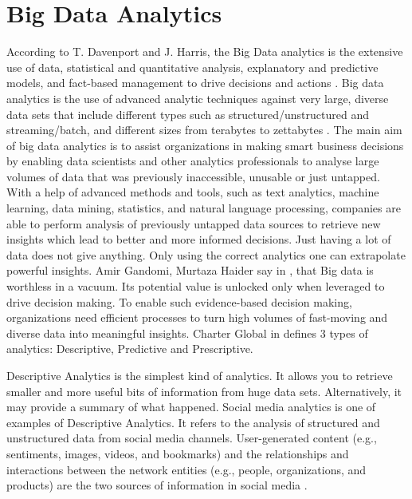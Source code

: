 \documentclass[runningheads]{llncs}
\begin{document}
\section{Big Data Analytics}
According to T. Davenport and J. Harris, the Big Data analytics is the extensive use of data, statistical and quantitative analysis, explanatory and predictive models, and fact-based management to drive decisions and actions \cite{DAVBOOK}. Big data analytics is the use of advanced analytic techniques against very large, diverse data sets that include different types such as structured/unstructured and streaming/batch, and different sizes from terabytes to zettabytes \cite{IBM}. The main aim of big data analytics is to assist organizations in making smart business decisions by enabling data scientists and other analytics professionals to analyse large volumes of data that  was previously inaccessible, unusable or just untapped.  With a help of advanced methods and tools, such as text analytics, machine learning, data mining, statistics, and natural language processing, companies are able to perform analysis of previously untapped data sources to retrieve new insights which lead to better and more informed decisions. Just having a lot of data does not give anything. Only using the correct analytics one can extrapolate powerful insights. Amir Gandomi, Murtaza Haider say in \cite{ELS}, that Big data is worthless in a vacuum. Its potential value is unlocked only when leveraged to drive decision making. To enable such evidence-based decision making, organizations need efficient processes to turn high volumes of fast-moving and diverse data into meaningful insights. Charter Global in \cite{CHARTER} defines 3 types of analytics: Descriptive, Predictive and Prescriptive. 

Descriptive Analytics is the simplest kind of analytics. It allows you to retrieve smaller and more useful bits of information from huge data sets. Alternatively, it may provide a summary of what happened. Social media analytics is one of examples of Descriptive Analytics. It refers to the analysis of structured and unstructured data from social media channels. User-generated content (e.g., sentiments, images, videos, and bookmarks) and the relationships and interactions between the network entities (e.g., people, organizations, and products) are the two sources of information in social media \cite{ELS}. 
\end{document}
